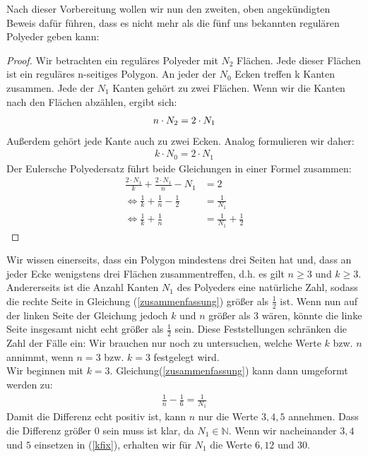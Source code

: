 Nach dieser Vorbereitung wollen wir nun den zweiten, oben angekündigten Beweis dafür führen, dass es nicht mehr als die fünf uns bekannten regulären Polyeder geben kann:
\begin{proof}
Wir betrachten ein reguläres Polyeder mit $N_2$ Flächen. Jede dieser Flächen ist ein reguläres n-seitiges Polygon.
An jeder der $N_0$ Ecken treffen k Kanten zusammen.
Jede der $N_1$ Kanten gehört zu zwei Flächen. Wenn wir die Kanten nach den Flächen abzählen, ergibt sich:
\begin{align}
\setcounter{equation}{0}
n\cdot N_2= 2\cdot N_1 \label{start1}
\end{align}
Außerdem gehört jede Kante auch zu zwei Ecken. Analog formulieren wir daher:
\begin{align}
k\cdot N_0=2 \cdot N_1 \label{start2}
\end{align}
Der Eulersche Polyedersatz führt beide Gleichungen in einer Formel zusammen:
\begin{align}
\frac{2\cdot N_1}{k} + \frac{2\cdot N_1}{n} - N_1 &= 2 \\
\Leftrightarrow \frac{1}{k} + \frac{1}{n} - \frac{1}{2} &= \frac{1}{N_1}\\
\Leftrightarrow \frac{1}{k} + \frac{1}{n}  &= \frac{1}{N_1} + \frac{1}{2}\label{zusammenfassung}
\end{align}
\end{proof}
Wir wissen einerseits, dass ein Polygon mindestens drei Seiten hat und, dass an jeder Ecke wenigstens drei Flächen zusammentreffen, d.h. es gilt $n\geq 3$ und $k\geq 3$. Andererseits ist die Anzahl Kanten $N_1$ des Polyeders eine natürliche Zahl, sodass die rechte Seite in Gleichung (\ref{zusammenfassung}) größer als $\frac{1}{2}$ ist. Wenn nun auf der linken Seite der Gleichung jedoch $k$ und $n$ größer als 3 wären, könnte die linke Seite insgesamt nicht echt größer als $\frac{1}{2}$  sein. Diese Feststellungen schränken die Zahl der Fälle ein: Wir brauchen nur noch zu untersuchen, welche Werte $k$ bzw. $n$ annimmt, wenn $n=3$ bzw. $k=3$ festgelegt wird.\\
Wir beginnen mit $k=3$.
Gleichung(\ref{zusammenfassung}) kann dann umgeformt werden zu:
\begin{align}
\frac{1}{n}- \frac{1}{6}= \frac{1}{N_1} \label{kfix}
\end{align}
Damit die Differenz echt positiv ist, kann $n$ nur die Werte $3, 4, 5$ annehmen. Dass die Differenz größer 0 sein muss ist klar, da $N_1 \in \mathbb{N}$.
Wenn wir nacheinander $3,4$ und $5$ einsetzen in (\ref{kfix}), erhalten wir für $N_1$ die Werte $6, 12$ und $30$.\\
